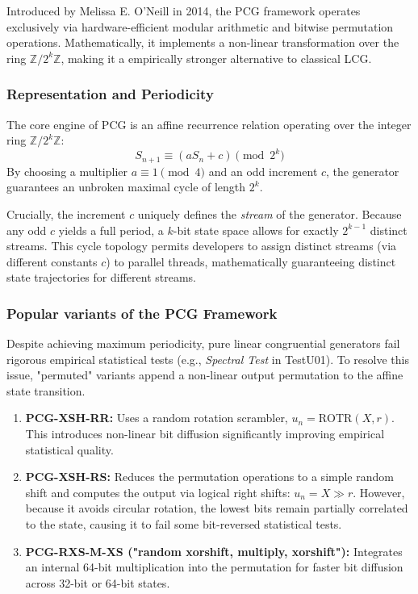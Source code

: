 Introduced by Melissa E. O'Neill in 2014, the PCG framework operates exclusively via hardware-efficient modular arithmetic and bitwise permutation operations. Mathematically, it implements a non-linear transformation over the ring $\mathbb{Z}/2^k\mathbb{Z}$, making it a empirically stronger alternative to classical LCG.


\subsubsection{Representation and Periodicity}

The core engine of PCG is an affine recurrence relation operating over the integer ring $\mathbb{Z}/2^k\mathbb{Z}$:
$$
S_{n+1} \equiv (a S_n + c) \pmod{2^k}
$$
By choosing a multiplier $a \equiv 1 \pmod 4$ and an odd increment $c$, the generator guarantees an unbroken maximal cycle of length $2^k$.

Crucially, the increment $c$ uniquely defines the \textit{stream} of the generator. Because any odd $c$ yields a full period, a $k$-bit state space allows for exactly $2^{k-1}$ distinct streams. This cycle topology permits developers to assign distinct streams (via different constants $c$) to parallel threads, mathematically guaranteeing distinct state trajectories for different streams.


\subsubsection{Popular variants of the PCG Framework}

Despite achieving maximum periodicity, pure linear congruential generators fail rigorous empirical statistical tests (e.g., \textit{Spectral Test} in TestU01). To resolve this issue, "permuted" variants append a non-linear output permutation to the affine state transition.

\begin{enumerate}
    \item \textbf{PCG-XSH-RR:} Uses a random rotation scrambler, $u_n = \text{ROTR}(X, r)$. This introduces non-linear bit diffusion significantly improving empirical statistical quality.

    \item \textbf{PCG-XSH-RS:} Reduces the permutation operations to a simple random shift and computes the output via logical right shifts: $u_n = X \gg r$. However, because it avoids circular rotation, the lowest bits remain partially correlated to the state, causing it to fail some bit-reversed statistical tests.

    \item \textbf{PCG-RXS-M-XS ("random xorshift, multiply, xorshift"):} Integrates an internal 64-bit multiplication into the permutation for faster bit diffusion across 32-bit or 64-bit states. 
\end{enumerate}